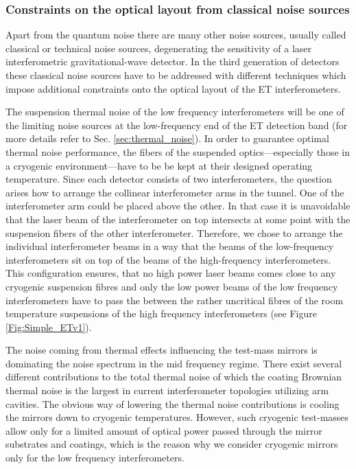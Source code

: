 \subsubsection{Constraints on the optical layout from classical noise sources }
\label{sec:opt_layout_class}

Apart from the quantum noise there are many other noise sources,
usually called classical or technical noise sources, degenerating
the sensitivity of a laser interferometric gravitational-wave
detector. In the third generation of detectors these classical
noise sources have to be addressed with different techniques which
impose additional constraints onto the optical layout of the ET
interferometers.

The suspension thermal noise of the low frequency interferometers will
be one of the limiting noise sources at the low-frequency end of the 
ET detection band (for more details refer to Sec. \ref{sec:thermal_noise}).
In order to guarantee optimal
thermal noise performance, the fibers of the suspended optics---especially
those in a cryogenic environment---have to be be kept at 
their designed operating temperature. Since each detector consists of two
interferometers,  the question arises how to arrange the collinear
interferometer arms in the tunnel. One of the
interferometer arm could be placed above the other. In that case it is
 unavoidable that the laser beam of the interferometer on top
 intersects at some point with the suspension fibers
of the other interferometer. Therefore, we chose to arrange the individual 
interferometer beams in a way that the beams of the low-frequency interferometers
sit on top of the beams of the high-frequency interferometers. This configuration
ensures, that no high power laser beams comes close to any cryogenic 
suspension fibres and only the low power beams of the low frequency interferometers 
have to pass the between the rather uncritical fibres of the room temperature
 suspensions of the high frequency interferometers (see Figure \ref{Fig:Simple_ETv1}). 

The noise coming from thermal effects
influencing the test-mass mirrors is dominating the noise spectrum
in the mid frequency regime. There exist several different
contributions to the total thermal noise of which the coating
Brownian thermal noise is the largest in current interferometer
topologies utilizing arm cavities. The obvious way of lowering
the thermal noise contributions is cooling the mirrors down to cryogenic
temperatures. However, such cryogenic test-masses allow only for a  limited
amount of optical power passed through the mirror substrates and
coatings, which is the reason why we consider cryogenic mirrors
only for the low frequency interferometers.

